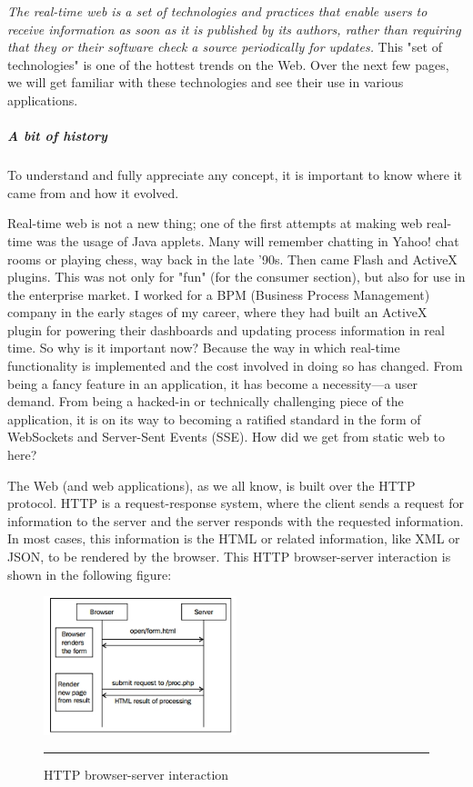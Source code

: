 \textit{The real-time web is a set of technologies and practices that enable users to receive
information as soon as it is published by its authors, rather than requiring that they
or their software check a source periodically for updates.
}
This "set of technologies" is one of the hottest trends on the Web. Over the
next few pages, we will get familiar with these technologies and see their use
in various applications.\cite{15}

\subparagraph*{A bit of history}
\hfill \break
To understand and fully appreciate any concept, it is important to know where it
came from and how it evolved.

Real-time web is not a new thing; one of the first attempts at making web real-time
was the usage of Java applets. Many will remember chatting in Yahoo! chat rooms or
playing chess, way back in the late '90s. Then came Flash and ActiveX plugins. This
was not only for "fun" (for the consumer section), but also for use in the enterprise
market. I worked for a BPM (Business Process Management) company in the early
stages of my career, where they had built an ActiveX plugin for powering their
dashboards and updating process information in real time. So why is it important
now? Because the way in which real-time functionality is implemented and the cost
involved in doing so has changed. From being a fancy feature in an application,
it has become a necessity—a user demand. From being a hacked-in or technically
challenging piece of the application, it is on its way to becoming a ratified standard
in the form of WebSockets and Server-Sent Events (SSE). How did we get from static
web to here?\cite{15}

The Web (and web applications), as we all know, is built over the HTTP protocol.
HTTP is a request-response system, where the client sends a request for information
to the server and the server responds with the requested information. In most
cases, this information is the HTML or related information, like XML or JSON, to
be rendered by the browser. This HTTP browser-server interaction is shown in the
following figure:

\begin{figure}[h!]
  \centering
    \includegraphics[width=0.5\textwidth]{./Pictures/http.jpg}
  \rule{0.5\textwidth}{1pt}
    \caption{HTTP browser-server interaction}
\end{figure}

